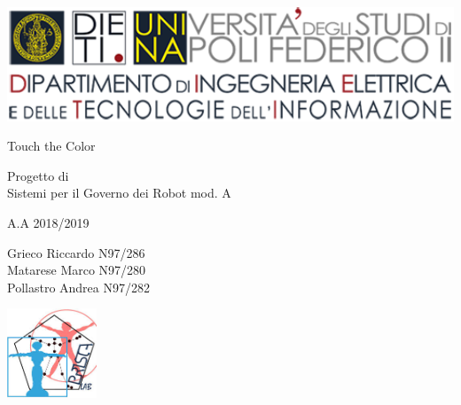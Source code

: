 
\thispagestyle{empty}

\begin{center}
	\includegraphics[width=1\textwidth]{images/DIETI}
	
	\par\bigskip
	\par\bigskip\par\bigskip\par\bigskip\par\bigskip\par\bigskip\par\bigskip\par\bigskip\par	%
	
	{\huge Touch the Color\\}
	
	\par\bigskip\par\bigskip\par\bigskip\par\bigskip\par\bigskip\par\bigskip\par	%
	
	{\LARGE Progetto di \\}
	{\LARGE Sistemi per il Governo dei Robot mod. A\\}
	{\large A.A 2018/2019\par}
	
	\par\bigskip\par\bigskip\par\bigskip\par\bigskip\par\bigskip\par\bigskip
	
	{\large Grieco Riccardo N97/286 \\}
	{\large Matarese Marco N97/280 \\}
	{\large Pollastro Andrea N97/282 \\}
	
	\par\bigskip\par\bigskip\par\bigskip\par\bigskip\par\bigskip\par\bigskip
	
	\includegraphics[width=0.2\textwidth]{images/prisca.jpg}
\end{center}
